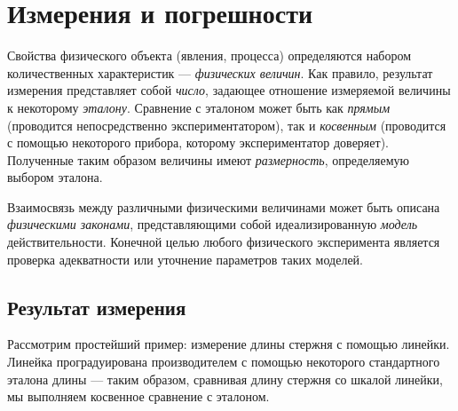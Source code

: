 \chapter{Измерения и погрешности}


Свойства физического объекта (явления, процесса) определяются набором
количественных характеристик --- \emph{физических величин}.
Как правило, результат измерения представляет
собой \emph{число}, задающее отношение измеряемой величины к некоторому \emph{эталону}.
Сравнение с эталоном может быть как
\emph{прямым} (проводится непосредственно
экспериментатором), так и \emph{косвенным} (проводится с помощью некоторого
прибора, которому экспериментатор доверяет).
Полученные таким образом величины имеют \emph{размерность}, определяемую выбором эталона.


Взаимосвязь между различными физическими величинами может быть описана
\emph{физическими законами}, представляющими собой идеализированную
\emph{модель} действительности. Конечной целью любого физического
эксперимента является проверка адекватности или
уточнение параметров таких моделей.

\section{Результат измерения}

Рассмотрим простейший пример: измерение длины стержня
с помощью линейки. Линейка проградуирована производителем с помощью
некоторого стандартного эталона длины --- таким образом, сравнивая длину
стержня со шкалой линейки, мы выполняем косвенное сравнение с
эталоном.


